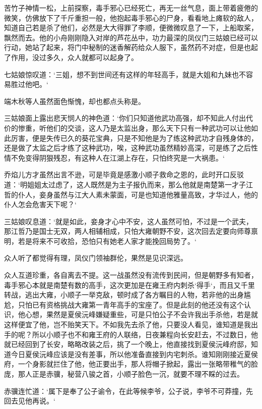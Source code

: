 苦竹子神情一松，上前探察，毒手邪心已经死亡，再无一丝气息，面上带着疲倦的微笑，仿佛放下了千斤重担一般，他抱起毒手邪心的尸身，看看地上瘫软的敌人，知道自己若是杀了他们，必然是大大得罪了李顺，便微微叹息了一下，上船取桨，飘然而去。他的小舟刚刚隐入对岸的芦花丛中，功力最深的凤仪门三姑娘已经可以行动，她站了起来，将门中秘制的迷香解药给众人服下，虽然药不对症，但是也起了作用，没过多久，众人就都可以起身了。

七姑娘惊叹道：‘三姐，想不到世间还有这样的年轻高手，就是大姐和九妹也不容易胜过他吧。‘

端木秋等人虽然面色惭愧，却也都点头称是。

三姑娘面上露出悲天悯人的神色道：‘你们只知道他武功高强，却不知此人付出代价的惨重，听他们的交谈，这人乃是太监出身，那么天下只有一种武功可以让他如此厉害，便是失传已久的葵花宝典，只是不知他是为了练这种武功才自残身体的，还是做了太监之后才练了这种武功，唉，这种武功虽然精妙高深，可是练了之后性情不免变得阴狠残忍，有这种人在江湖上存在，只怕终究是一大祸患。‘

乔焰儿方才虽然出言不逊，可是毕竟是感激小顺子救命之恩的，此时开口反驳道：‘明姐姐太过虑了，这人既然是为主子报仇而来，那么他就是南楚第一才子江哲的仆人，妾身虽然与江大人素未蒙面，可是也知道他雅量高致，才华过人，他的仆人怎会危害天下呢？‘

三姑娘叹息道：‘就是如此，妾身才心中不安，这人虽然可怕，不过是一个武夫，那江哲乃是国士无双，两人相辅相成，只怕大雍朝野不安，这次回去定要向师尊禀明，若是将来不可收拾，恐怕只有她老人家才能挽回局势了。‘

众人听了都觉得有理，凤仪门领袖群伦，果然是见识深远。

众人互道珍重，各自离去不提。这一战虽然没有流传到民间，但是朝野多有知者，毒手邪心本就是南楚有数的高手，这次更加是在雍王府内刺杀‘得手‘，而且又千里转战，逃出大雍，小顺子一举克敌，顿时成了各方瞩目的人物，若非他的出身尴尬，只怕已有资格挑战大雍第一青年高手的宝座了。但是此刻的他还没有这个认识，他心想，果然是夏侯沅峰嫌疑重些，可是只怕公子不会许我出手杀他，若是就这样便宜了他，岂不贻笑天下。不如我先去杀了他，只要没人看见，谁知道是我出手的呢？所以小顺子也不和雍王府的人联络，日夜兼程向长安赶去，不过数日，他就已经回到了长安，略略改装之后，挑了一个晚上，他直接找到夏侯沅峰府邸，知道今日夏侯沅峰应该是没有差事，所以他准备直接到内宅刺杀。谁知刚刚接近夏侯府，一个身影就拦住了他，他正要出手，那人将帽子掀起，露出一张略带稚气的脸庞，那人正是赤骥，秘营八骏之首，小顺子脸色一沉，就要不理不睬的过去。

赤骥连忙道：‘属下是奉了公子谕令，在此等候李爷，公子说，李爷不可莽撞，先回去见他再说。‘

